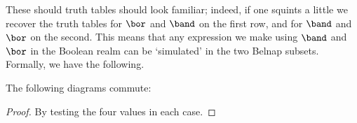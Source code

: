 These should truth tables should look familiar; indeed, if one squints a little
we recover the truth tables for \(\bor\) and \(\band\) on the first row, and for
\(\band\) and \(\bor\) on the second.
This means that any expression we make using \(\band\) and \(\bor\) in the
Boolean realm can be `simulated' in the two Belnap subsets.
Formally, we have the following.

\begin{lemma}\label{lem:belnap-bool-correspondence}
    The following diagrams commute:
    \begin{center}
        \quad

        \hspace{0.3em}
        \quad
    \end{center}
\end{lemma}
\begin{proof}
    By testing the four values in each case.
\end{proof}

